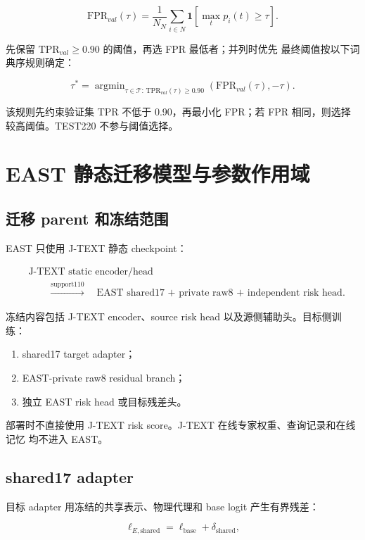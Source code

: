 \documentclass[11pt,a4paper]{article}
\begin{document}
\[
\mathrm{FPR}_{val}(\tau)
=
\frac{1}{N_N}\sum_{i\in N}
\mathbf{1}\left[
\max_t p_i(t)\ge\tau
\right].
\]

先保留 \(\mathrm{TPR}_{val}\ge0.90\) 的阈值，再选 FPR 最低者；并列时优先
最终阈值按以下词典序规则确定：

\[
\tau^*=\mathop{\arg\min}_{\tau\in\mathcal{T}:\,
\mathrm{TPR}_{val}(\tau)\geq0.90}
\left(\mathrm{FPR}_{val}(\tau),-\tau\right).
\]

该规则先约束验证集 TPR 不低于 0.90，再最小化 FPR；若 FPR 相同，则选择
较高阈值。TEST220 不参与阈值选择。

\section{EAST 静态迁移模型与参数作用域}

\subsection{迁移 parent 和冻结范围}

EAST 只使用 J-TEXT 静态 checkpoint：

\[
\begin{aligned}
&\text{J-TEXT static encoder/head}\\[-1mm]
&\qquad\xrightarrow{\text{support110}}\quad
\text{EAST shared17 + private raw8 + independent risk head}.
\end{aligned}
\]

冻结内容包括 J-TEXT encoder、source risk head 以及源侧辅助头。目标侧训练：

\begin{enumerate}
\item shared17 target adapter；
\item EAST-private raw8 residual branch；
\item 独立 EAST risk head 或目标残差头。
\end{enumerate}

部署时不直接使用 J-TEXT risk score。J-TEXT 在线专家权重、查询记录和在线记忆
均不进入 EAST。

\subsection{shared17 adapter}

目标 adapter 用冻结的共享表示、物理代理和 base logit 产生有界残差：

\[
\ell_{E,\mathrm{shared}}
=\ell_{\mathrm{base}}+\delta_{\mathrm{shared}},
\]
\end{document}
